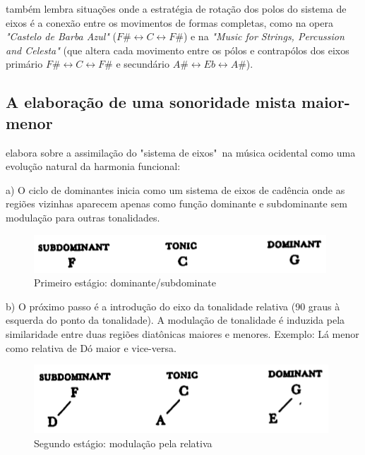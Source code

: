 \documentclass[
	12pt,				%
	openright,			%
	twoside,			%
	a4paper,			%
	english,			%
	french,				%
	spanish,			%
	brazil				%
	]{abntex2}
\begin{document}
 também lembra situações onde a estratégia de rotação dos polos do sistema de eixos é a conexão entre os movimentos de formas completas, como na opera \textit{"Castelo de Barba Azul"} ($F\# \leftrightarrow  C \leftrightarrow F\#$) e na \textit{"Music for Strings, Percussion and Celesta" } (que altera cada movimento entre os pólos e contrapólos dos eixos primário $F\# \leftrightarrow  C \leftrightarrow F\#$ e secundário $A\# \leftrightarrow  Eb \leftrightarrow A\#$).
\pagebreak


\subsection{A elaboração de uma sonoridade mista maior-menor}
\label{lendvai_maior_menor}

 elabora sobre a assimilação do "sistema de eixos"\ na música ocidental como uma evolução natural da harmonia funcional: 

a) O ciclo de dominantes inicia como um sistema de eixos de cadência onde as regiões vizinhas aparecem apenas como função dominante e subdominante sem modulação para outras tonalidades. 

\begin{figure}[!h]
	\caption{\label{fig_grafico}Primeiro estágio: dominante/subdominate}
	\begin{center}
	    \includegraphics[scale=0.5]{axis/estagio01.png}
	\end{center}
\end{figure}


b) O próximo passo é a introdução do eixo da tonalidade relativa (90 graus à esquerda do ponto da tonalidade). A modulação de tonalidade é induzida pela similaridade entre duas regiões diatônicas maiores e menores. Exemplo: Lá menor como relativa de Dó maior e vice-versa.

\begin{figure}[!h]
	\caption{\label{fig_grafico}Segundo estágio: modulação pela relativa}
	\begin{center}
	    \includegraphics[scale=0.5]{axis/estagio02.png}
	\end{center}
\end{figure}
\end{document}
